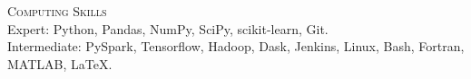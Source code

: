 \documentclass[letterpaper, 11pt]{article} %
\begin{document}
    
\textsc{Computing Skills} \\
    Expert:
        Python,
        Pandas,
        NumPy,
        SciPy,
        scikit-learn,
        Git. \\
    Intermediate:
        PySpark,
        Tensorflow,
        Hadoop,
        Dask,
        Jenkins,
        Linux,
        Bash,
        Fortran,
        MATLAB,
        \LaTeX. \\
\end{document}
